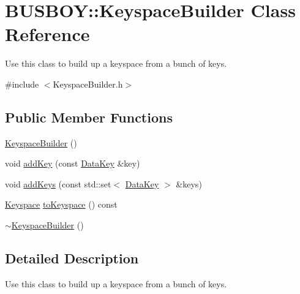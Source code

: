 \hypertarget{classBUSBOY_1_1KeyspaceBuilder}{
\section{BUSBOY::KeyspaceBuilder Class Reference}
\label{classBUSBOY_1_1KeyspaceBuilder}
}


Use this class to build up a keyspace from a bunch of keys.  


{\ttfamily \#include $<$KeyspaceBuilder.h$>$}\subsection*{Public Member Functions}
\begin{DoxyCompactItemize}
\item 
\hyperlink{classBUSBOY_1_1KeyspaceBuilder_a4e7ff3c10ed5a2f124c11585ef289557}{KeyspaceBuilder} ()
\item 
void \hyperlink{classBUSBOY_1_1KeyspaceBuilder_afa598f7a0b1b7cc1cf02df0e4e5a9e13}{addKey} (const \hyperlink{classBUSBOY_1_1DataKey}{DataKey} \&key)
\item 
void \hyperlink{classBUSBOY_1_1KeyspaceBuilder_ab4e1f462bcb554829e3d6f2f829b728f}{addKeys} (const std::set$<$ \hyperlink{classBUSBOY_1_1DataKey}{DataKey} $>$ \&keys)
\item 
\hyperlink{classBUSBOY_1_1Keyspace}{Keyspace} \hyperlink{classBUSBOY_1_1KeyspaceBuilder_a26afabca05fdb23c5e3830eb4cb5a150}{toKeyspace} () const 
\item 
\hyperlink{classBUSBOY_1_1KeyspaceBuilder_a23ea85cfd091c99af2cb1b3a7f076472}{$\sim$KeyspaceBuilder} ()
\end{DoxyCompactItemize}


\subsection{Detailed Description}
Use this class to build up a keyspace from a bunch of keys. 

